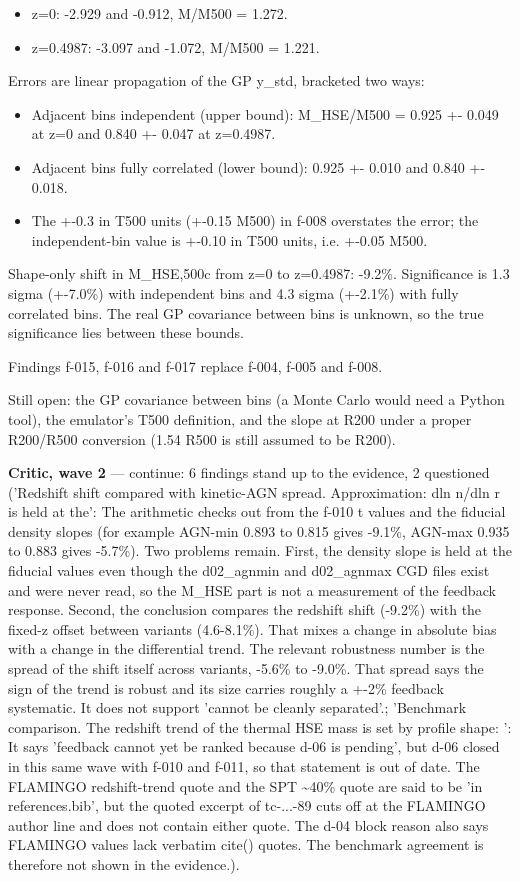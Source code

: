 \documentclass[11pt,a4paper]{article}
\begin{document}
\begin{itemize}
  \item z=0: -2.929 and -0.912, M/M500 = 1.272.
  \item z=0.4987: -3.097 and -1.072, M/M500 = 1.221.
\end{itemize}
Errors are linear propagation of the GP y\_std, bracketed two ways:

\begin{itemize}
  \item Adjacent bins independent (upper bound): M\_HSE/M500 = 0.925 +- 0.049 at z=0 and 0.840 +- 0.047 at z=0.4987.
  \item Adjacent bins fully correlated (lower bound): 0.925 +- 0.010 and 0.840 +- 0.018.
  \item The +-0.3 in T500 units (+-0.15 M500) in f-008 overstates the error; the independent-bin value is +-0.10 in T500 units, i.e. +-0.05 M500.
\end{itemize}
Shape-only shift in M\_HSE,500c from z=0 to z=0.4987: -9.2\%. Significance is 1.3 sigma (+-7.0\%) with independent bins and 4.3 sigma (+-2.1\%) with fully correlated bins. The real GP covariance between bins is unknown, so the true significance lies between these bounds.

Findings f-015, f-016 and f-017 replace f-004, f-005 and f-008.

Still open: the GP covariance between bins (a Monte Carlo would need a Python tool), the emulator's T500 definition, and the slope at R200 under a proper R200/R500 conversion (1.54 R500 is still assumed to be R200).

\textbf{Critic, wave 2} --- continue: 6 findings stand up to the evidence, 2 questioned ('Redshift shift compared with kinetic-AGN spread. Approximation: dln n/dln r is held at the': The arithmetic checks out from the f-010 t values and the fiducial density slopes (for example AGN-min 0.893 to 0.815 gives -9.1\%, AGN-max 0.935 to 0.883 gives -5.7\%). Two problems remain. First, the density slope is held at the fiducial values even though the d02\_agnmin and d02\_agnmax CGD files exist and were never read, so the M\_HSE part is not a measurement of the feedback response. Second, the conclusion compares the redshift shift (-9.2\%) with the fixed-z offset between variants (4.6-8.1\%). That mixes a change in absolute bias with a change in the differential trend. The relevant robustness number is the spread of the shift itself across variants, -5.6\% to -9.0\%. That spread says the sign of the trend is robust and its size carries roughly a +-2\% feedback systematic. It does not support 'cannot be cleanly separated'.; 'Benchmark comparison. The redshift trend of the thermal HSE mass is set by profile shape: ': It says 'feedback cannot yet be ranked because d-06 is pending', but d-06 closed in this same wave with f-010 and f-011, so that statement is out of date. The FLAMINGO redshift-trend quote and the SPT \textasciitilde{}40\% quote are said to be 'in references.bib', but the quoted excerpt of tc-...-89 cuts off at the FLAMINGO author line and does not contain either quote. The d-04 block reason also says FLAMINGO values lack verbatim cite() quotes. The benchmark agreement is therefore not shown in the evidence.).
\end{document}
